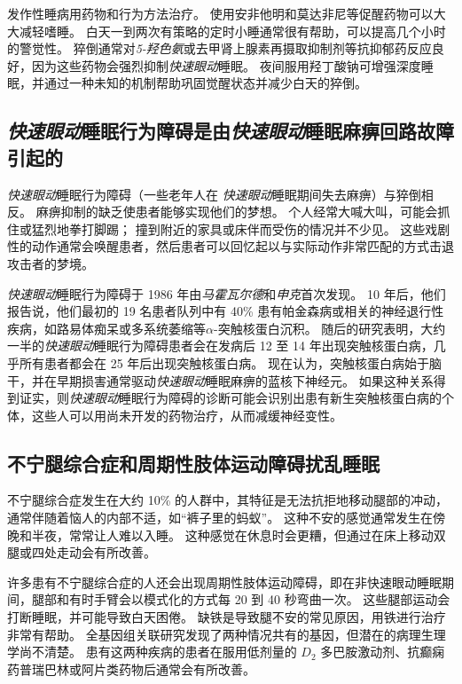 发作性睡病用药物和行为方法治疗。
使用安非他明和莫达非尼等促醒药物可以大大减轻嗜睡。
白天一到两次有策略的定时小睡通常很有帮助，可以提高几个小时的警觉性。
猝倒通常对\textit{5-羟色氨}或去甲肾上腺素再摄取抑制剂等抗抑郁药反应良好，因为这些药物会强烈抑制\textit{快速眼动}睡眠。
夜间服用羟丁酸钠可增强深度睡眠，并通过一种未知的机制帮助巩固觉醒状态并减少白天的猝倒。



\subsection{\textit{快速眼动}睡眠行为障碍是由\textit{快速眼动}睡眠麻痹回路故障引起的}

\textit{快速眼动}睡眠行为障碍（一些老年人在 \textit{快速眼动}睡眠期间失去麻痹）与猝倒相反。
麻痹抑制的缺乏使患者能够实现他们的梦想。
个人经常大喊大叫，可能会抓住或猛烈地拳打脚踢；
撞到附近的家具或床伴而受伤的情况并不少见。
这些戏剧性的动作通常会唤醒患者，然后患者可以回忆起以与实际动作非常匹配的方式击退攻击者的梦境。


\textit{快速眼动}睡眠行为障碍于 1986 年由\textit{马霍瓦尔德}和\textit{申克}首次发现。
10 年后，他们报告说，他们最初的 19 名患者队列中有 40\% 患有帕金森病或相关的神经退行性疾病，如路易体痴呆或多系统萎缩等$ \alpha $-突触核蛋白沉积。
随后的研究表明，大约一半的\textit{快速眼动}睡眠行为障碍患者会在发病后 12 至 14 年出现突触核蛋白病，几乎所有患者都会在 25 年后出现突触核蛋白病。
现在认为，突触核蛋白病始于脑干，并在早期损害通常驱动\textit{快速眼动}睡眠麻痹的蓝核下神经元。
如果这种关系得到证实，则\textit{快速眼动}睡眠行为障碍的诊断可能会识别出患有新生突触核蛋白病的个体，这些人可以用尚未开发的药物治疗，从而减缓神经变性。



\subsection{不宁腿综合症和周期性肢体运动障碍扰乱睡眠}

不宁腿综合症发生在大约 10\% 的人群中，其特征是无法抗拒地移动腿部的冲动，通常伴随着恼人的内部不适，如“裤子里的蚂蚁”。
这种不安的感觉通常发生在傍晚和半夜，常常让人难以入睡。
这种感觉在休息时会更糟，但通过在床上移动双腿或四处走动会有所改善。


许多患有不宁腿综合症的人还会出现周期性肢体运动障碍，即在非快速眼动睡眠期间，腿部和有时手臂会以模式化的方式每 20 到 40 秒弯曲一次。
这些腿部运动会打断睡眠，并可能导致白天困倦。
缺铁是导致腿不安的常见原因，用铁进行治疗非常有帮助。
全基因组关联研究发现了两种情况共有的基因，但潜在的病理生理学尚不清楚。
患有这两种疾病的患者在服用低剂量的 $D_2$ 多巴胺激动剂、抗癫痫药普瑞巴林或阿片类药物后通常会有所改善。



